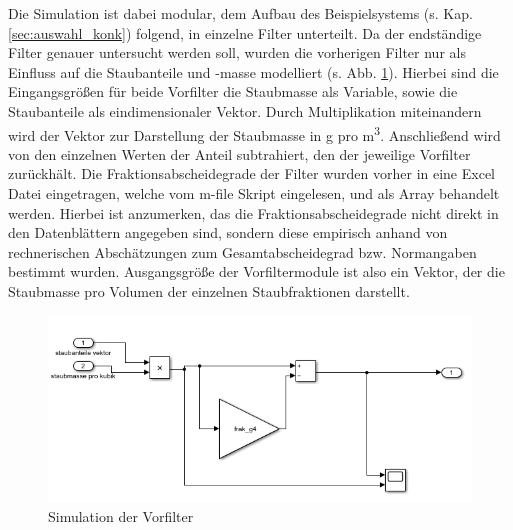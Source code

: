     Die Simulation ist dabei modular, dem Aufbau des Beispielsystems (s. Kap. \ref{sec:auswahl_konk}) folgend, in einzelne Filter unterteilt. Da der endständige Filter genauer untersucht werden soll, wurden die vorherigen Filter nur als Einfluss auf die Staubanteile und -masse modelliert (s. Abb. \ref{fi:sim_vorfilter}). Hierbei sind die Eingangsgrößen für beide Vorfilter die Staubmasse als Variable, sowie die Staubanteile als eindimensionaler Vektor. Durch Multiplikation miteinandern wird der Vektor zur Darstellung der Staubmasse in \si{\gram} pro \si{\cubic\meter}. Anschließend wird von den einzelnen Werten der Anteil subtrahiert, den der jeweilige Vorfilter zurückhält. Die Fraktionsabscheidegrade der Filter wurden vorher in eine Excel Datei eingetragen, welche vom m-file Skript eingelesen, und als Array behandelt werden. Hierbei ist anzumerken, das die Fraktionsabscheidegrade nicht direkt in den Datenblättern angegeben sind, sondern diese empirisch anhand von rechnerischen Abschätzungen zum Gesamtabscheidegrad bzw. Normangaben bestimmt wurden. Ausgangsgröße der Vorfiltermodule ist also ein Vektor, der die Staubmasse pro Volumen der einzelnen Staubfraktionen darstellt.
    \begin{figure}[H]
        \begin{center}
            \includegraphics[width=\linewidth]{images/sim_vorfilter.png}
            \caption[Simulation der Vorfilter]{Simulation der Vorfilter}
            \label{fi:sim_vorfilter}
        \end{center}
    \end{figure}
